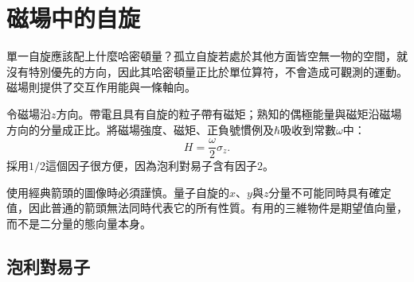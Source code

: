 \begin{classroomqa}
\end{classroomqa}

\begin{classroomqa}
\end{classroomqa}

\section{磁場中的自旋}

單一自旋應該配上什麼哈密頓量？孤立自旋若處於其他方面皆空無一物的空間，就沒有特別優先的方向，因此其哈密頓量正比於單位算符，不會造成可觀測的運動。磁場則提供了交互作用能與一條軸向。

令磁場沿\(z\)方向。帶電且具有自旋的粒子帶有磁矩；熟知的偶極能量與磁矩沿磁場方向的分量成正比。將磁場強度、磁矩、正負號慣例及\(\hbar\)吸收到常數\(\omega\)中：
\begin{equation}
H=\frac{\omega}{2}\sigma_z.
\label{eq:l5-z-hamiltonian}
\end{equation}
採用\(1/2\)這個因子很方便，因為泡利對易子含有因子\(2\)。

使用經典箭頭的圖像時必須謹慎。量子自旋的\(x\)、\(y\)與\(z\)分量不可能同時具有確定值，因此普通的箭頭無法同時代表它的所有性質。有用的三維物件是期望值向量，而不是二分量的態向量本身。

\subsection{泡利對易子}

